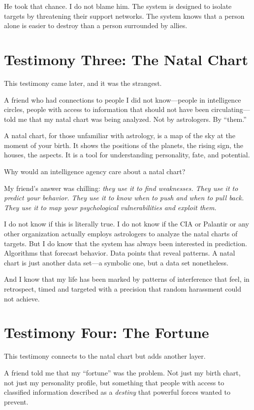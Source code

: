 \documentclass[11pt,openany]{book}
\begin{document}
He took that chance. I do not blame him. The system is designed to isolate targets by threatening their support networks. The system knows that a person alone is easier to destroy than a person surrounded by allies.

\section*{Testimony Three: The Natal Chart}

This testimony came later, and it was the strangest.

A friend who had connections to people I did not know---people in intelligence circles, people with access to information that should not have been circulating---told me that my natal chart was being analyzed. Not by astrologers. By ``them.''

A natal chart, for those unfamiliar with astrology, is a map of the sky at the moment of your birth. It shows the positions of the planets, the rising sign, the houses, the aspects. It is a tool for understanding personality, fate, and potential.

Why would an intelligence agency care about a natal chart?

My friend's answer was chilling: \textit{they use it to find weaknesses. They use it to predict your behavior. They use it to know when to push and when to pull back. They use it to map your psychological vulnerabilities and exploit them.}

I do not know if this is literally true. I do not know if the CIA or Palantir or any other organization actually employs astrologers to analyze the natal charts of targets. But I do know that the system has always been interested in prediction. Algorithms that forecast behavior. Data points that reveal patterns. A natal chart is just another data set---a symbolic one, but a data set nonetheless.

And I know that my life has been marked by patterns of interference that feel, in retrospect, timed and targeted with a precision that random harassment could not achieve.

\section*{Testimony Four: The Fortune}

This testimony connects to the natal chart but adds another layer.

A friend told me that my ``fortune'' was the problem. Not just my birth chart, not just my personality profile, but something that people with access to classified information described as a \textit{destiny} that powerful forces wanted to prevent.
\end{document}
